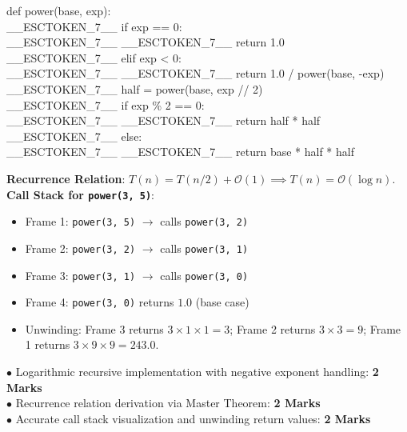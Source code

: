 \begin{solutionbox}
\begin{pycode}
def power(base, exp):\\
\_\_ESCTOKEN\_7\_\_ if exp == 0:\\
\_\_ESCTOKEN\_7\_\_ \_\_ESCTOKEN\_7\_\_ return 1.0\\
\_\_ESCTOKEN\_7\_\_ elif exp < 0:\\
\_\_ESCTOKEN\_7\_\_ \_\_ESCTOKEN\_7\_\_ return 1.0 / power(base, -exp)\\
\_\_ESCTOKEN\_7\_\_ half = power(base, exp // 2)\\
\_\_ESCTOKEN\_7\_\_ if exp \% 2 == 0:\\
\_\_ESCTOKEN\_7\_\_ \_\_ESCTOKEN\_7\_\_ return half * half\\
\_\_ESCTOKEN\_7\_\_ else:\\
\_\_ESCTOKEN\_7\_\_ \_\_ESCTOKEN\_7\_\_ return base * half * half
\end{pycode}
\textbf{Recurrence Relation}: $T(n) = T(n/2) + \mathcal{O}(1) \implies T(n) = \mathcal{O}(\log n)$.\\
\textbf{Call Stack for \texttt{power(3, 5)}}:
\begin{itemize}[leftmargin=1.5em]
    \item Frame 1: \texttt{power(3, 5)} $\to$ calls \texttt{power(3, 2)}
    \item Frame 2: \texttt{power(3, 2)} $\to$ calls \texttt{power(3, 1)}
    \item Frame 3: \texttt{power(3, 1)} $\to$ calls \texttt{power(3, 0)}
    \item Frame 4: \texttt{power(3, 0)} returns $1.0$ (base case)
    \item Unwinding: Frame 3 returns $3 \times 1 \times 1 = 3$; Frame 2 returns $3 \times 3 = 9$; Frame 1 returns $3 \times 9 \times 9 = 243.0$.
\end{itemize}
\begin{markingrubric}
$\bullet$ Logarithmic recursive implementation with negative exponent handling: \textbf{2 Marks}\\
$\bullet$ Recurrence relation derivation via Master Theorem: \textbf{2 Marks}\\
$\bullet$ Accurate call stack visualization and unwinding return values: \textbf{2 Marks}
\end{markingrubric}
\end{solutionbox}

\newpage
